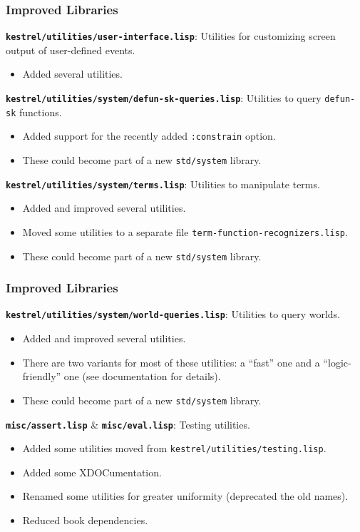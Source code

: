 \documentclass{beamer}
\newcommand{\code}[1]{\texttt{#1}}
\newcommand{\bookpath}[1]{\textbf{\code{#1}}}
\newcommand{\implibtitle}{\frametitle{Improved Libraries}}
\newcommand{\separation}{\vspace*{1ex}}
\begin{document}
\begin{frame}

\implibtitle

\bookpath{kestrel/utilities/user-interface.lisp}:
Utilities for customizing screen output of user-defined events.
\begin{itemize}
\item
Added several utilities.
\end{itemize}

\separation

\bookpath{kestrel/utilities/system/defun-sk-queries.lisp}:
Utilities to query \code{defun-sk} functions.
\begin{itemize}
\item
Added support for the recently added \code{:constrain} option.
\item
These could become part of a new \code{std/system} library.
\end{itemize}

\separation

\bookpath{kestrel/utilities/system/terms.lisp}:
Utilities to manipulate terms.
\begin{itemize}
\item
Added and improved several utilities.
\item
Moved some utilities to a separate file
\code{term-function-recognizers.lisp}.
\item
These could become part of a new \code{std/system} library.
\end{itemize}

\end{frame}


\begin{frame}

\implibtitle

\bookpath{kestrel/utilities/system/world-queries.lisp}:
Utilities to query worlds.
\begin{itemize}
\item
Added and improved several utilities.
\item
There are two variants for most of these utilities:
a ``fast'' one and a ``logic-friendly'' one
(see documentation for details).
\item
These could become part of a new \code{std/system} library.
\end{itemize}

\separation

\bookpath{misc/assert.lisp} \& \bookpath{misc/eval.lisp}:
Testing utilities.
\begin{itemize}
\item
Added some utilities moved from \code{kestrel/utilities/testing.lisp}.
\item
Added some XDOCumentation.
\item
Renamed some utilities for greater uniformity
(deprecated the old names).
\item
Reduced book dependencies.
\end{itemize}

\end{frame}
\end{document}
